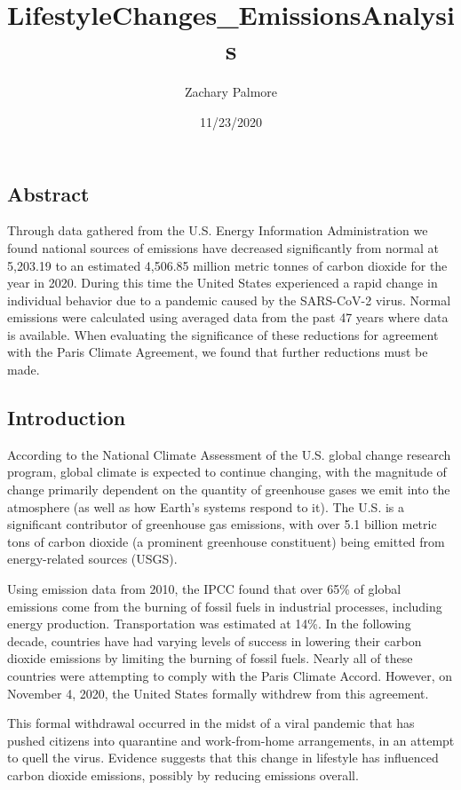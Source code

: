 \documentclass[
]{article}
\title{LifestyleChanges\_EmissionsAnalysis}
\author{Zachary Palmore}
\date{11/23/2020}
\begin{document}
\maketitle

\hypertarget{abstract}{%
\subsection{Abstract}\label{abstract}}

Through data gathered from the U.S. Energy Information Administration we
found national sources of emissions have decreased significantly from
normal at 5,203.19 to an estimated 4,506.85 million metric tonnes of
carbon dioxide for the year in 2020. During this time the United States
experienced a rapid change in individual behavior due to a pandemic
caused by the SARS-CoV-2 virus. Normal emissions were calculated using
averaged data from the past 47 years where data is available. When
evaluating the significance of these reductions for agreement with the
Paris Climate Agreement, we found that further reductions must be made.

\hypertarget{introduction}{%
\subsection{Introduction}\label{introduction}}

According to the National Climate Assessment of the U.S. global change
research program, global climate is expected to continue changing, with
the magnitude of change primarily dependent on the quantity of
greenhouse gases we emit into the atmosphere (as well as how Earth's
systems respond to it). The U.S. is a significant contributor of
greenhouse gas emissions, with over 5.1 billion metric tons of carbon
dioxide (a prominent greenhouse constituent) being emitted from
energy-related sources (USGS).

Using emission data from 2010, the IPCC found that over 65\% of global
emissions come from the burning of fossil fuels in industrial processes,
including energy production. Transportation was estimated at 14\%. In
the following decade, countries have had varying levels of success in
lowering their carbon dioxide emissions by limiting the burning of
fossil fuels. Nearly all of these countries were attempting to comply
with the Paris Climate Accord. However, on November 4, 2020, the United
States formally withdrew from this agreement.

This formal withdrawal occurred in the midst of a viral pandemic that
has pushed citizens into quarantine and work-from-home arrangements, in
an attempt to quell the virus. Evidence suggests that this change in
lifestyle has influenced carbon dioxide emissions, possibly by reducing
emissions overall.
\end{document}
